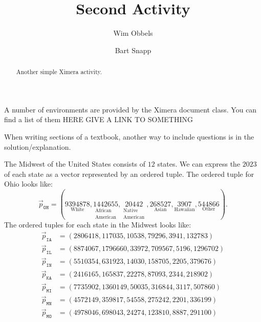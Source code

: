 \documentclass{ximera}
\author{Wim Obbels \and Bart Snapp}
\title{Second  Activity}
\begin{document}
\begin{abstract}
    Another simple Ximera activity.
\end{abstract}
\maketitle
\label{xim:secondActivity}

A number of environments are provided by the Ximera document class. You can find a list of them HERE GIVE A LINK TO SOMETHING

When writing sections of a textbook, another way to include questions is in the solution/explanation.

\begin{example} %
    The Midwest of the United States consists of $12$ states. We can
    express the $2023$
    of each state as a vector represented by an ordered tuple. The
    ordered tuple for Ohio looks like:
    \[
    \vec{p}_{\texttt{OH}} = (\underset{\text{White}}{9394878},\underset{\begin{smallmatrix}\text{African}\\ \text{American}\end{smallmatrix}}{1442655},\underset{\begin{smallmatrix}\text{Native}\\\text{American}\end{smallmatrix}}{20442},\underset{\text{Asian}}{268527},\underset{\text{Hawaiian}}{3907},\underset{\text{Other}}{544866}).
    \]
    The ordered tuples for each state in the Midwest looks like:
  \[
  \begin{aligned}
    \vec{p}_{\texttt{IA}} &= (2806418,117035,10538,79296,3941,132783)\\
    \vec{p}_{\texttt{IL}} &= (8874067,1796660,33972,709567,5196,1296702)\\
    \vec{p}_{\texttt{IN}} &= (5510354,631923,14030,158705,2205,379676)\\
    \vec{p}_{\texttt{KA}} &= (2416165,165837,22278,87093,2344,218902)\\
    \vec{p}_{\texttt{MI}} &= (7735902,1360149,50035,316844,3117,507860)\\
    \vec{p}_{\texttt{MN}} &= (4572149,359817,54558,275242,2201,336199)\\
    \vec{p}_{\texttt{MO}} &= (4978046,698043,24274,123810,8887,291100)\\

\end{aligned}\]
\end{example}
\end{document}
